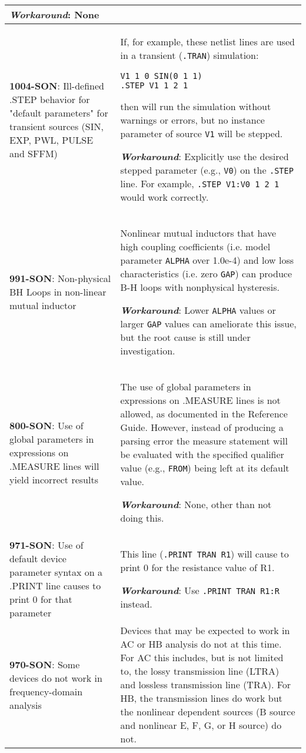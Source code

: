 {\begin{longtable}[h] {>{\raggedright\small}m{2in}|>{\raggedright\let\\\tabularnewline\small}m{3.5in}}
\textbf{\textit{Workaround}}: None
\\ \hline

\textbf{1004-SON}: Ill-defined .STEP behavior for "default parameters" for 
transient sources (SIN, EXP, PWL, PULSE and SFFM) & If, for example,
these netlist lines are used in a transient (\texttt{.TRAN}) simulation:
\begin{verbatim}
V1 1 0 SIN(0 1 1)
.STEP V1 1 2 1
\end{verbatim}
then \Xyce{} will run the simulation without warnings or errors, but
no instance parameter of source \texttt{V1} will be stepped.  

\textbf{\textit{Workaround}}: Explicitly use the desired stepped parameter
(e.g., \texttt{V0}) on the \texttt{.STEP} line.  For example, 
\texttt{.STEP V1:V0 1 2 1} would work correctly.
\\ \hline

\textbf{991-SON}: Non-physical BH Loops in non-linear mutual inductor &
Nonlinear mutual inductors that have high coupling coefficients (i.e. 
model parameter \texttt{ALPHA} over 1.0e-4) and low loss characteristics 
(i.e. zero \texttt{GAP}) can produce B-H loops with nonphysical hysteresis.

\textbf{\textit{Workaround}}: Lower \texttt{ALPHA} values or larger 
\texttt{GAP} values can ameliorate this issue, but the root cause is 
still under investigation. 
\\ \hline

\textbf{800-SON}: Use of global parameters in expressions on .MEASURE lines
will yield incorrect results & The use of global parameters in expressions
on .MEASURE lines is not allowed, as documented in the \Xyce{} Reference Guide.
However, instead of producing a parsing error the measure statement will be
evaluated with the specified qualifier value (e.g., \texttt{FROM}) being left
at its default value.

\textbf{\textit{Workaround}}: None, other than not doing this.
\\ \hline

\textbf{971-SON}: Use of default device parameter syntax on a .PRINT line causes
\Xyce{} to print 0 for that parameter & This line (\texttt{.PRINT TRAN R1}) will
cause \Xyce{} to print 0 for the resistance value of R1.

\textbf{\textit{Workaround}}: Use \texttt{.PRINT TRAN R1:R} instead.
\\ \hline

\textbf{970-SON}: Some devices do not work in frequency-domain analysis &
Devices that may be expected to work in AC or HB analysis do not at
this time.  For AC this includes, but is not limited to, the lossy
transmission line (LTRA) and lossless transmission line (TRA).  For
HB, the transmission lines do work but the nonlinear dependent sources
(B source and nonlinear E, F, G, or H source) do not.


\end{longtable}}
